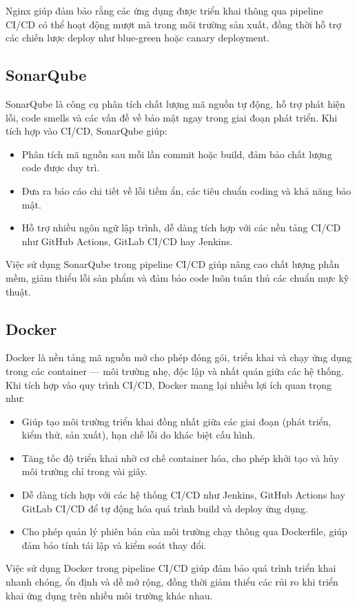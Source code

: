 Nginx giúp đảm bảo rằng các ứng dụng được triển khai thông qua pipeline CI/CD có thể hoạt động mượt mà trong môi trường sản xuất, đồng thời hỗ trợ các chiến lược deploy như blue-green hoặc canary deployment.

\subsection{SonarQube}

SonarQube là công cụ phân tích chất lượng mã nguồn tự động, hỗ trợ phát hiện lỗi, code smells và các vấn đề về bảo mật ngay trong giai đoạn phát triển. Khi tích hợp vào CI/CD, SonarQube giúp: 
\begin{itemize} 
	\item Phân tích mã nguồn sau mỗi lần commit hoặc build, đảm bảo chất lượng code được duy trì. 
	\item Đưa ra báo cáo chi tiết về lỗi tiềm ẩn, các tiêu chuẩn coding và khả năng bảo mật. 
	\item Hỗ trợ nhiều ngôn ngữ lập trình, dễ dàng tích hợp với các nền tảng CI/CD như GitHub Actions, GitLab CI/CD hay Jenkins. 
\end{itemize}

Việc sử dụng SonarQube trong pipeline CI/CD giúp nâng cao chất lượng phần mềm, giảm thiểu lỗi sản phẩm và đảm bảo code luôn tuân thủ các chuẩn mực kỹ thuật.

\subsection{Docker}

Docker là nền tảng mã nguồn mở cho phép đóng gói, triển khai và chạy ứng dụng trong các container — môi trường nhẹ, độc lập và nhất quán giữa các hệ thống.  
Khi tích hợp vào quy trình CI/CD, Docker mang lại nhiều lợi ích quan trọng như:

\begin{itemize}
	\item Giúp tạo môi trường triển khai đồng nhất giữa các giai đoạn (phát triển, kiểm thử, sản xuất), hạn chế lỗi do khác biệt cấu hình.
	\item Tăng tốc độ triển khai nhờ cơ chế container hóa, cho phép khởi tạo và hủy môi trường chỉ trong vài giây.
	\item Dễ dàng tích hợp với các hệ thống CI/CD như Jenkins, GitHub Actions hay GitLab CI/CD để tự động hóa quá trình build và deploy ứng dụng.
	\item Cho phép quản lý phiên bản của môi trường chạy thông qua Dockerfile, giúp đảm bảo tính tái lập và kiểm soát thay đổi.
\end{itemize}

Việc sử dụng Docker trong pipeline CI/CD giúp đảm bảo quá trình triển khai nhanh chóng, ổn định và dễ mở rộng, đồng thời giảm thiểu các rủi ro khi triển khai ứng dụng trên nhiều môi trường khác nhau.
